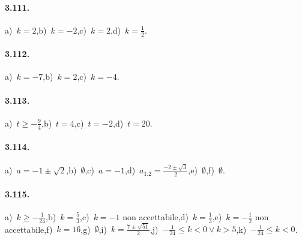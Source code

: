 \paragraph{3.111.} a)~$ k = 2 $,\quad b)~$ k = -2 $,\quad c)~$ k = 2 $,\quad d)~$ k = \frac{1}{2} $.

\paragraph{3.112.} a)~$k=-7$,\quad b)~$k = 2$,\quad c)~$ k = -4 $.

\paragraph{3.113.} a)~$t\ge-\frac{9}{4}$,\quad b)~$t=4$,\quad c)~$t=-2$,\quad d)~$t=20$.

\paragraph{3.114.} a)~$ a =-1 \pm \sqrt{2} $,\quad b)~$ \emptyset $,\quad c)~$ a =-1 $,\quad d)~$ a_{1.2} =\frac{- 2 \pm \sqrt{3}}{2} $,\quad e)~$ \emptyset $,\quad f)~$ \emptyset $.

\paragraph{3.115.} a)~$ k \geq-\frac{1}{24} $,\quad b)~$ k = \frac{5}{3} $,\quad c)~$ k=-1 $ non accettabile,\quad d)~$ k = \frac{1}{3} $,\quad e)~$ k =-\frac{1}{2}$ non accettabile,\quad f)~$ k = 16 $,\quad g)~$ \emptyset $,\quad i)~$ k = \frac{7 \pm \sqrt{51}}{2} $,\quad j)~$ - \frac{1}{24} \leq k < 0 \vee k > 5 $,\quad k)~$ - \frac{1}{24} \leq k < 0 $.

